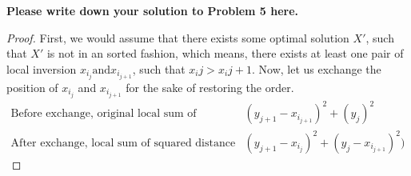 \documentclass[11pt,twoside]{article}
\newenvironment{solution}{{\par\noindent\it Solution.}}{}
\begin{document}
\begin{solution}
\textbf{Please write down your solution to Problem 5 here.}
\begin{proof}
First, we would assume that there exists some optimal solution $X'$, such that $X'$ is not in an sorted fashion, which means, there exists at least one pair of local inversion $x_{i_{j}}\text{and}x_{i_{j+1}}$, such that $x_{i}{j}>x_{i}{j+1}$.
Now, let us exchange the position of $x_{i_{j}}$ and $x_{i_{j+1}}$ for the sake of restoring the order. \begin{align*}
    \text{Before exchange, original local sum of squared distance}& (y_{j+1}-x_{i_{j+1}})^{2} + (y_{j})^{2}\\
    \text{After exchange, local sum of squared distance}& (y_{j+1}-x_{i_{j}})^{2}+(y_{j}-x_{i_{j+1}})^{2})
\end{align*}
\end{proof}
\end{solution}
\end{document}
